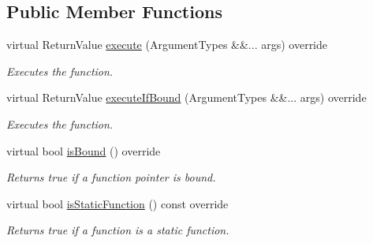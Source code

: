 \subsection*{Public Member Functions}
\begin{DoxyCompactItemize}
\item 
virtual Return\+Value \mbox{\hyperlink{class_arcana_1_1_member_function_callback_instance_aa3da0ee51ae4a6465844c7af67da7d83}{execute}} (Argument\+Types \&\&... args) override
\begin{DoxyCompactList}\small\item\em Executes the function. \end{DoxyCompactList}\item 
virtual Return\+Value \mbox{\hyperlink{class_arcana_1_1_member_function_callback_instance_a4d8c12162b9d7b42ad9916d2dba5327d}{execute\+If\+Bound}} (Argument\+Types \&\&... args) override
\begin{DoxyCompactList}\small\item\em Executes the function. \end{DoxyCompactList}\item 
\mbox{\label{class_arcana_1_1_member_function_callback_instance_ae9c3a3e3a3b8722c34b1133763a8227b}} 
virtual bool \mbox{\hyperlink{class_arcana_1_1_member_function_callback_instance_ae9c3a3e3a3b8722c34b1133763a8227b}{is\+Bound}} () override
\begin{DoxyCompactList}\small\item\em Returns true if a function pointer is bound. \end{DoxyCompactList}\item 
\mbox{\label{class_arcana_1_1_member_function_callback_instance_aa15906d8500efc0ba749a7390748eeb7}} 
virtual bool \mbox{\hyperlink{class_arcana_1_1_member_function_callback_instance_aa15906d8500efc0ba749a7390748eeb7}{is\+Static\+Function}} () const override
\begin{DoxyCompactList}\small\item\em Returns true if a function is a static function. \end{DoxyCompactList}\item 
\mbox{\label{class_arcana_1_1_member_function_callback_instance_a9cafc44cbe8d2df52ca94d516f9809ba}} 

\end{DoxyCompactItemize}
